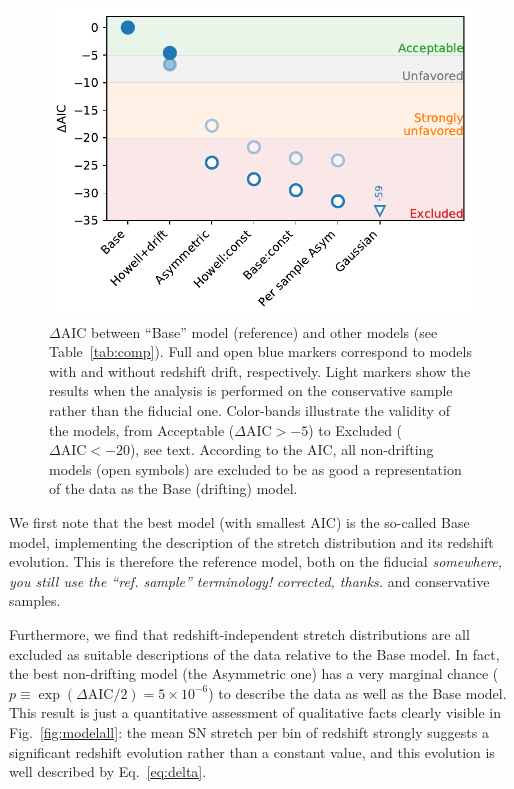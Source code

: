 \documentclass[]{aa} %
\newcommand{\nn}[1]{{\textcolor[rgb]{0.25, 0.50, 0}{#1}}}
\newcommand{\yc}[1]{{\textcolor{BrickRed}{#1}}}
\begin{document}
\begin{figure}
    \centering
    \includegraphics[width=\linewidth]{Article_figures/mod_comp.pdf}
    \caption{$\Delta$AIC between ``Base'' model (reference) and other models
        (see Table~\ref{tab:comp}). Full and open blue markers correspond to
        models with and without redshift drift, respectively. Light markers show
        the results when the analysis is performed on the conservative sample
        rather than the fiducial one.  Color-bands illustrate the validity of
        the models, from  Acceptable ($\Delta\mathrm{AIC} > -5$) to Excluded
        ($\Delta\mathrm{AIC} < -20$), see text. According to the AIC, all
    non-drifting models (open symbols) are excluded to be as good a representation
of the data as the Base (drifting) model.}
    \label{fig:mod_comp}
\end{figure}

We first note that the best model (with smallest AIC) is the so-called Base
model, implementing the \cite{rigault2018} description of the stretch
distribution and its redshift evolution. This is therefore the reference model,
both on the fiducial \yc{\textit{somewhere, you still use the ``ref. sample''
terminology!}} \nn{\textit{corrected, thanks.}} and conservative samples.

Furthermore, we find that redshift-independent stretch distributions are all
excluded as \nn{suitable} descriptions of the data relative to the Base model.
In fact, the best non-drifting model (the Asymmetric one) has a very marginal
chance ($p \equiv \exp\left(\Delta\mathrm{AIC}/2\right) = 5\times10^{-6}$) to
describe the data as well as the Base model. This result is just a quantitative
assessment of qualitative facts clearly visible in Fig.~\ref{fig:modelall}: the
mean SN stretch per bin of redshift strongly suggests a significant redshift
evolution rather than a constant value, and this evolution is well described by
Eq.~\ref{eq:delta}.
\end{document}
